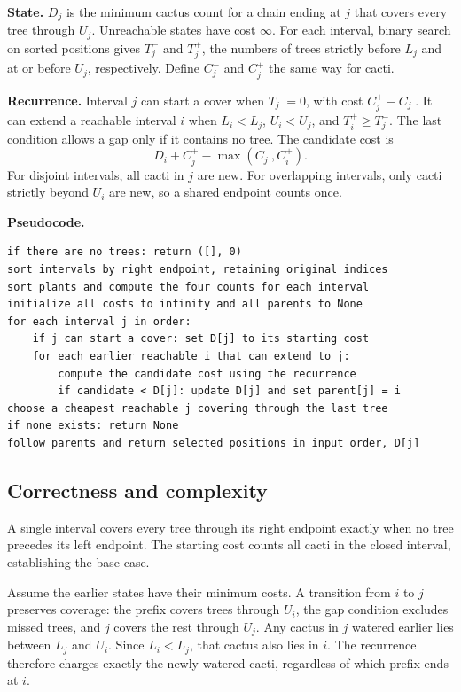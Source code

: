 \documentclass[11pt]{article}
\begin{document}
\textbf{State.} $D_j$ is the minimum cactus count for a chain ending at $j$ that covers every tree through $U_j$. Unreachable states have cost $\infty$. For each interval, binary search on sorted positions gives $T_j^-$ and $T_j^+$, the numbers of trees strictly before $L_j$ and at or before $U_j$, respectively. Define $C_j^-$ and $C_j^+$ the same way for cacti.

\textbf{Recurrence.} Interval $j$ can start a cover when $T_j^-=0$, with cost $C_j^+-C_j^-$. It can extend a reachable interval $i$ when $L_i<L_j$, $U_i<U_j$, and $T_i^+\ge T_j^-$. The last condition allows a gap only if it contains no tree. The candidate cost is
\[
 D_i+C_j^+-\max(C_j^-,C_i^+).
\]
For disjoint intervals, all cacti in $j$ are new. For overlapping intervals, only cacti strictly beyond $U_i$ are new, so a shared endpoint counts once.

\textbf{Pseudocode.}
\begin{verbatim}
if there are no trees: return ([], 0)
sort intervals by right endpoint, retaining original indices
sort plants and compute the four counts for each interval
initialize all costs to infinity and all parents to None
for each interval j in order:
    if j can start a cover: set D[j] to its starting cost
    for each earlier reachable i that can extend to j:
        compute the candidate cost using the recurrence
        if candidate < D[j]: update D[j] and set parent[j] = i
choose a cheapest reachable j covering through the last tree
if none exists: return None
follow parents and return selected positions in input order, D[j]
\end{verbatim}

\newpage
\subsection{Correctness and complexity}
A single interval covers every tree through its right endpoint exactly when no tree precedes its left endpoint. The starting cost counts all cacti in the closed interval, establishing the base case.

Assume the earlier states have their minimum costs. A transition from $i$ to $j$ preserves coverage: the prefix covers trees through $U_i$, the gap condition excludes missed trees, and $j$ covers the rest through $U_j$. Any cactus in $j$ watered earlier lies between $L_j$ and $U_i$. Since $L_i<L_j$, that cactus also lies in $i$. The recurrence therefore charges exactly the newly watered cacti, regardless of which prefix ends at $i$.
\end{document}
